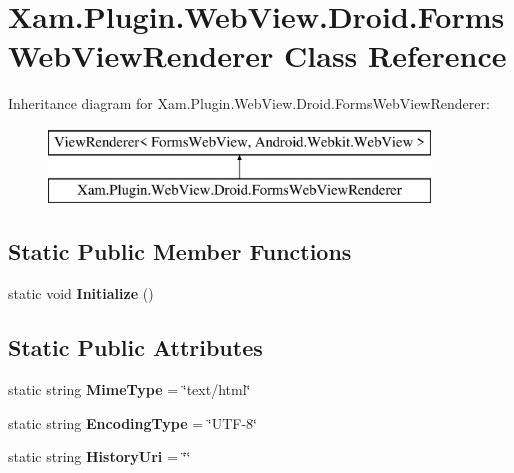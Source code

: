 \hypertarget{class_xam_1_1_plugin_1_1_web_view_1_1_droid_1_1_forms_web_view_renderer}{}\section{Xam.\+Plugin.\+Web\+View.\+Droid.\+Forms\+Web\+View\+Renderer Class Reference}
\label{class_xam_1_1_plugin_1_1_web_view_1_1_droid_1_1_forms_web_view_renderer}
Inheritance diagram for Xam.\+Plugin.\+Web\+View.\+Droid.\+Forms\+Web\+View\+Renderer\+:\begin{figure}[H]
\begin{center}
\leavevmode
\includegraphics[height=2.000000cm]{class_xam_1_1_plugin_1_1_web_view_1_1_droid_1_1_forms_web_view_renderer}
\end{center}
\end{figure}
\subsection*{Static Public Member Functions}
\begin{DoxyCompactItemize}
\item 
\mbox{\label{class_xam_1_1_plugin_1_1_web_view_1_1_droid_1_1_forms_web_view_renderer_a8eddf8afe1c7d1c4869d405c3e633c61}} 
static void {\bfseries Initialize} ()
\end{DoxyCompactItemize}
\subsection*{Static Public Attributes}
\begin{DoxyCompactItemize}
\item 
\mbox{\label{class_xam_1_1_plugin_1_1_web_view_1_1_droid_1_1_forms_web_view_renderer_ac10b754ab9b240c9fe8005d0920afce8}} 
static string {\bfseries Mime\+Type} = \char`\"{}text/html\char`\"{}
\item 
\mbox{\label{class_xam_1_1_plugin_1_1_web_view_1_1_droid_1_1_forms_web_view_renderer_af0c419b5723419015a6ab123590069aa}} 
static string {\bfseries Encoding\+Type} = \char`\"{}U\+TF-\/8\char`\"{}
\item 
\mbox{\label{class_xam_1_1_plugin_1_1_web_view_1_1_droid_1_1_forms_web_view_renderer_acd53baa9b8f3e616683b11a1b4243b26}} 
static string {\bfseries History\+Uri} = \char`\"{}\char`\"{}
\end{DoxyCompactItemize}
